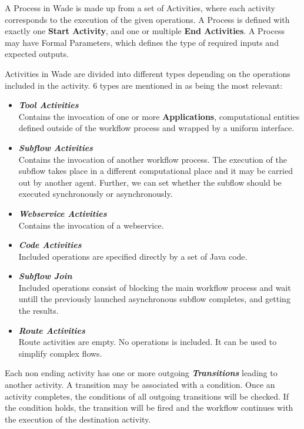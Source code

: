 A Process in Wade is made up from a set of Activities, where each activity corresponds to the execution of the given operations. A Process is defined with exactly one \textbf{Start Activity}, and one or multiple \textbf{End Activities}. A Process may have Formal Parameters, which defines the type of required inputs and expected outputs.

Activities in Wade are divided into different types depending on the operations included in the activity. 6 types are mentioned in \cite{GCWADEUG10} as being the most relevant:
\begin{itemize}
	\item \textbf{\textit{Tool Activities}}\\
	      Contains the invocation of one or more \textbf{Applications}, computational entities defined outside of the workflow process and wrapped by a uniform interface.
	\item \textbf{\textit{Subflow Activities}}\\
	      Contains the invocation of another workflow process. The execution of the subflow takes place in a different computational place and it may be carried out by another agent. Further, we can set whether the subflow should be executed synchronously or asynchronously.
	\item \textbf{\textit{Webservice Activities}}\\
				Contains the invocation of a webservice.
	\item \textbf{\textit{Code Activities}}\\
				Included operations are specified directly by a set of Java code. 
	\item \textbf{\textit{Subflow Join}} \\
	      Included operations consist of blocking the main workflow process and wait untill the previously launched asynchronous subflow completes, and getting the results.
	\item \textbf{\textit{Route Activities}}\\
				Route activities are empty. No operations is included. It can be used to simplify complex flows. 
\end{itemize}
Each non ending activity has one or more outgoing \textbf{\textit{Transitions}} leading to another activity. A transition may be associated with a condition. Once an activity completes, the conditions of all outgoing transitions will be checked. If the condition holds, the transition will be fired and the workflow continues with the execution of the destination activity.

